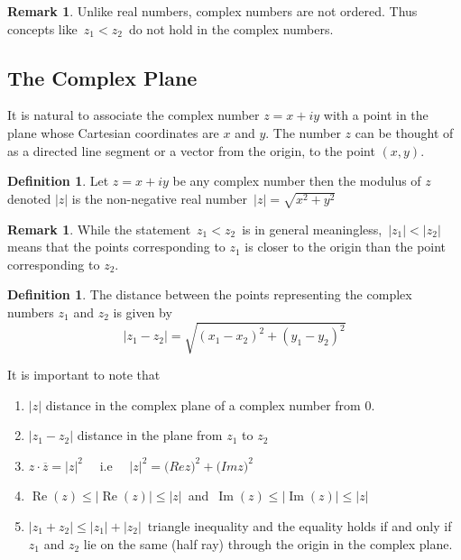 \documentclass[11pt,a4paper]{article}
\theoremstyle{definition}
\newtheorem{definition}[thm]{Definition}
\newtheorem{remark}[thm]{Remark}
\begin{document}
\begin{remark}
Unlike real numbers, complex numbers are not ordered. Thus concepts like $\, z_1 < z_2\,$ do not hold in the complex numbers.
\end{remark}

{\color[wave]{485}\subsection{The Complex Plane}}
It is natural to associate the complex number $z = x  + iy$ with a point in the plane whose Cartesian coordinates are $x$ and $y$. The number $z$ can be thought of as a directed line segment or a vector from the origin, to the point $(x,y)$.\\



\begin{definition}
Let $z = x + iy$ be any complex number then the modulus of $z$ denoted $\left|z\right|$ is the non-negative real number $\, \left|z\right| = \sqrt{x^2 + y^2}$
\end{definition}

\begin{remark}
While the statement $\, z_1 < z_2\,$ is in general meaningless, $\,\left|z_1\right| < \left|z_2\right|\,$ means that the points corresponding to $z_1$ is closer to the origin than the point corresponding to $z_2$.
\end{remark}

\begin{definition}
The distance between the points representing the complex numbers $z_1$ and $z_2$ is given by
$$\left|z_1 - z_2\right| = \sqrt{(x_1 -x_2)^2 + (y_1- y_2)^2}$$

It is important to note that

\begin{enumerate}
\item $\left|z\right|$ distance in the complex plane of  a complex number from $0$.
\item $\left|z_1 - z_2\right|$ distance in the plane from $z_1$ to $z_2$
\item $z\cdot \overline{z} = \left|z\right|^2\quad $ i.e $\quad  \left|z\right|^2 = \big(Re z\big)^2 + \big(Im z\big)^2$
\item  $\operatorname{Re} (z) \leq \left|\operatorname{Re}(z)\right| \leq \left|z\right|\,$ and $\, \operatorname{Im} (z) \leq \left|\operatorname{Im} (z)\right| \leq \left|z\right|$

\item $\left|z_1 + z_2\right| \leq \left|z_1\right| + \left|z_2\right|\,$ triangle inequality and the equality holds if and only if $z_1$ and $z_2$ lie on the same (half ray) through the origin in the complex plane.\\\\
\end{enumerate}
\end{definition}
\end{document}
